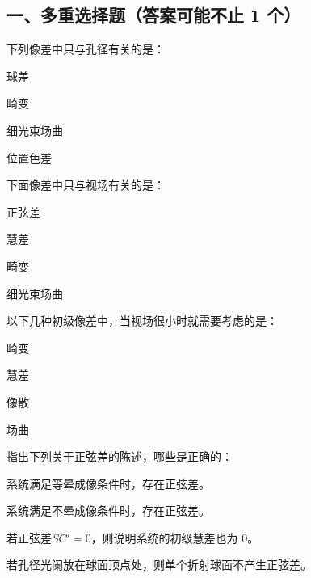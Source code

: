 \documentclass[padl, analysis, notocnum]{ExBook}
\newcommand{\answerarea}[1][3.5cm]{%
  \par\vspace{1mm}%
  \noindent{\color{themeColor!35}\rule{\linewidth}{0.4pt}}\par
  \noindent\begin{minipage}[t][#1][t]{\linewidth}\vspace{0pt}\end{minipage}\par
  \noindent{\color{themeColor!35}\rule{\linewidth}{0.4pt}}\par
}
\begin{document}
\subsection{一、多重选择题（答案可能不止 1 个）}
\begin{qitems}[startnum=1]
\qitem 下列像差中只与孔径有关的是：
\par\noindent\hspace{2em}球差
\par\noindent\hspace{2em}畸变
\par\noindent\hspace{2em}细光束场曲
\par\noindent\hspace{2em}位置色差
\label{q:108:start}
\answerarea[4.0cm]
\label{q:108:end}
\end{qitems}

\begin{qitems}[startnum=2]
\qitem 下面像差中只与视场有关的是：
\par\noindent\hspace{2em}正弦差
\par\noindent\hspace{2em}慧差
\par\noindent\hspace{2em}畸变
\par\noindent\hspace{2em}细光束场曲
\label{q:109:start}
\answerarea[4.0cm]
\label{q:109:end}
\end{qitems}

\begin{qitems}[startnum=3]
\qitem 以下几种初级像差中，当视场很小时就需要考虑的是：
\par\noindent\hspace{2em}畸变
\par\noindent\hspace{2em}慧差
\par\noindent\hspace{2em}像散
\par\noindent\hspace{2em}场曲
\label{q:110:start}
\answerarea[4.0cm]
\label{q:110:end}
\end{qitems}

\begin{qitems}[startnum=4]
\qitem 指出下列关于正弦差的陈述，哪些是正确的：
\par\noindent\hspace{2em}系统满足等晕成像条件时，存在正弦差。
\par\noindent\hspace{2em}系统满足不晕成像条件时，存在正弦差。
\par\noindent\hspace{2em}若正弦差$SC'=0$，则说明系统的初级慧差也为 0。
\par\noindent\hspace{2em}若孔径光阑放在球面顶点处，则单个折射球面不产生正弦差。
\label{q:111:start}
\answerarea[4.0cm]
\label{q:111:end}
\end{qitems}
\end{document}
